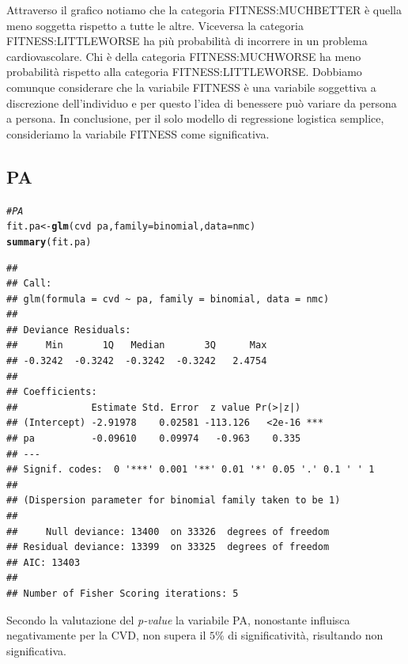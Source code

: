 \documentclass{article}\usepackage[]{graphicx}\usepackage[]{xcolor}
\makeatletter
\newcommand{\hlcom}[1]{\textcolor[rgb]{0.678,0.584,0.686}{\textit{#1}}}%
\newcommand{\hlopt}[1]{\textcolor[rgb]{0,0,0}{#1}}%
\newcommand{\hlstd}[1]{\textcolor[rgb]{0.345,0.345,0.345}{#1}}%
\newcommand{\hlkwb}[1]{\textcolor[rgb]{0.69,0.353,0.396}{#1}}%
\newcommand{\hlkwc}[1]{\textcolor[rgb]{0.333,0.667,0.333}{#1}}%
\newcommand{\hlkwd}[1]{\textcolor[rgb]{0.737,0.353,0.396}{\textbf{#1}}}%
\newenvironment{kframe}{%
 \def\at@end@of@kframe{}%
 \ifinner\ifhmode%
  \def\at@end@of@kframe{\end{minipage}}%
  \begin{minipage}{\columnwidth}%
 \fi\fi%
 \def\FrameCommand##1{\hskip\@totalleftmargin \hskip-\fboxsep
 \colorbox{shadecolor}{##1}\hskip-\fboxsep
     \hskip-\linewidth \hskip-\@totalleftmargin \hskip\columnwidth}%
 \MakeFramed {\advance\hsize-\width
   \@totalleftmargin\z@ \linewidth\hsize
   \@setminipage}}%
 {\par\unskip\endMakeFramed%
 \at@end@of@kframe}
\newenvironment{knitrout}{}{} %
\makeatother
\begin{document}
    Attraverso il grafico notiamo che la categoria FITNESS:MUCHBETTER è quella meno
    soggetta rispetto a tutte le altre. Viceversa la categoria FITNESS:LITTLEWORSE 
    ha più probabilità di incorrere in un problema cardiovascolare.
    Chi è della categoria FITNESS:MUCHWORSE ha meno probabilità rispetto alla 
    categoria FITNESS:LITTLEWORSE.
    Dobbiamo comunque considerare che la variabile FITNESS è una variabile
    soggettiva a discrezione dell'individuo e per questo l'idea di
    benessere può variare da persona a persona.
    In conclusione, per il solo modello di regressione logistica semplice,
    consideriamo la variabile FITNESS come significativa.
    
  \clearpage

  \subsection{PA}
\begin{knitrout}
\color{fgcolor}\begin{kframe}
\begin{alltt}
\hlcom{#PA}
\hlstd{fit.pa} \hlkwb{<-} \hlkwd{glm}\hlstd{(cvd}\hlopt{~}\hlstd{pa,} \hlkwc{family}\hlstd{=binomial,} \hlkwc{data}\hlstd{=nmc)}
\hlkwd{summary}\hlstd{(fit.pa)}
\end{alltt}
\begin{verbatim}
## 
## Call:
## glm(formula = cvd ~ pa, family = binomial, data = nmc)
## 
## Deviance Residuals: 
##     Min       1Q   Median       3Q      Max  
## -0.3242  -0.3242  -0.3242  -0.3242   2.4754  
## 
## Coefficients:
##             Estimate Std. Error  z value Pr(>|z|)    
## (Intercept) -2.91978    0.02581 -113.126   <2e-16 ***
## pa          -0.09610    0.09974   -0.963    0.335    
## ---
## Signif. codes:  0 '***' 0.001 '**' 0.01 '*' 0.05 '.' 0.1 ' ' 1
## 
## (Dispersion parameter for binomial family taken to be 1)
## 
##     Null deviance: 13400  on 33326  degrees of freedom
## Residual deviance: 13399  on 33325  degrees of freedom
## AIC: 13403
## 
## Number of Fisher Scoring iterations: 5
\end{verbatim}
\end{kframe}
\end{knitrout}
    
    Secondo la valutazione del \emph{p-value} la variabile PA, nonostante 
    influisca negativamente per la CVD, non supera il $5\%$ di significatività, 
    risultando non significativa.
    
\end{document}
